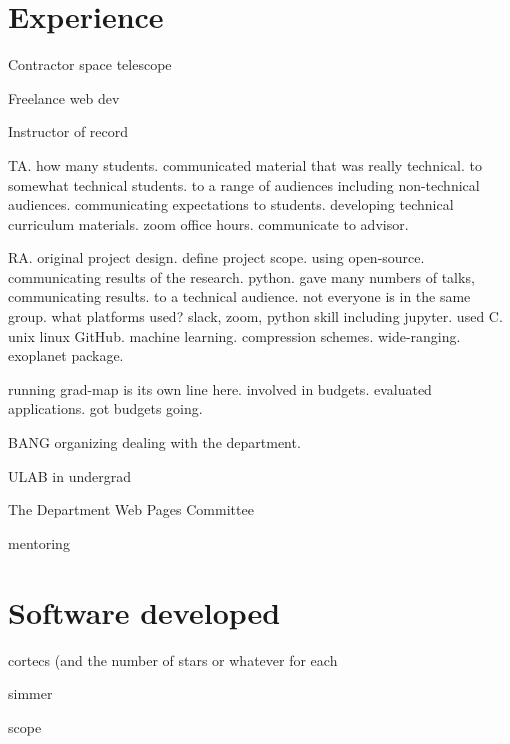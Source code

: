 \documentclass[letterpaper,12pt]{article}
\newcommand{\resumeSubHeadingListStart}{\begin{itemize}[leftmargin=*]}
\newcommand{\shorterSection}[1]{\vspace{-10pt}\section{#1}}
\begin{document}
\shorterSection{Experience}
\small
  \begin{list}{}{\cvlist}
    \item{Contractor space telescope}
    \item{Freelance web dev}
    \item{Instructor of record}
    \item{TA. how many students. communicated material that was really technical. to somewhat technical students. to a range of audiences including non-technical audiences. communicating expectations to students. developing technical curriculum materials. zoom office hours. communicate to advisor. }
    \item{RA. original project design. define project scope. using open-source. communicating results of the research. python. gave many numbers of talks, communicating results. to a technical audience. not everyone is in the same group. what platforms used? slack, zoom, python skill including jupyter. used C. unix linux GitHub. machine learning. compression schemes. wide-ranging. exoplanet package.}
    \item{running grad-map is its own line here. involved in budgets. evaluated applications. got budgets going.}
    \item{BANG organizing dealing with the department.}
    \item{ULAB in undergrad}
    \item{The Department Web Pages Committee}
    \item{mentoring}
\end{list}

%     

\shorterSection{Software developed}
\small
  \begin{list}{}{\cvlist}
    \item{cortecs (and the number of stars or whatever for each}
    \item{simmer}
    \item{scope}
\end{list}


\end{document}
